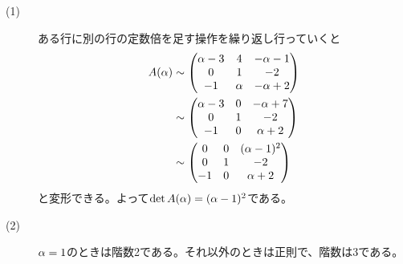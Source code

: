 \newpage


\subsubsection{}
\begin{sol} ${}$
\begin{description}
  \item[(1)] ある行に別の行の定数倍を足す操作を繰り返し行っていくと
  \begin{align*}
    A({\alpha}) &\sim \begin{pmatrix}  {\alpha} -3 & 4 & - {\alpha} -1 \\ 0 & 1  & -2 \\ -1 & {\alpha} & - {\alpha} +2 \end{pmatrix} \\
    &\sim \begin{pmatrix}  {\alpha} -3 & 0 & - {\alpha} +7 \\ 0 & 1  & -2 \\ -1 & 0 & {\alpha} +2 \end{pmatrix} \\
    &\sim \begin{pmatrix}  0 & 0 & ({\alpha} - 1)^2 \\ 0 & 1  & -2 \\ -1 & 0 & {\alpha} +2 \end{pmatrix} \\
  \end{align*}
  と変形できる。よって$\det A({\alpha}) = ({\alpha} - 1)^2$である。
  \item[(2)] ${\alpha}=1$のときは階数2である。それ以外のときは正則で、階数は3である。
\end{description}

\end{sol}


\newpage



